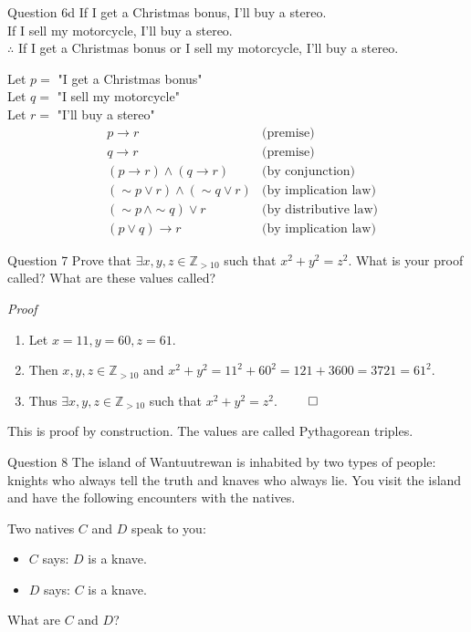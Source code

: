 \documentclass[10pt]{beamer}
\begin{document}
\begin{frame}[fragile]{Question 6d}
    If I get a Christmas bonus, I’ll buy a stereo. \\
    If I sell my motorcycle, I’ll buy a stereo. \\
    $\therefore$ If I get a Christmas bonus or I sell my motorcycle, I’ll buy a stereo. \par
    Let $p =$ "I get a Christmas bonus" \\
    Let $q =$ "I sell my motorcycle" \\
    Let $r =$ "I’ll buy a stereo"
\begin{align*}
    &p \rightarrow r &\text{(premise)} \\
    &q \rightarrow r &\text{(premise)} \\
    &(p \rightarrow r) \land (q \rightarrow r) &\text{(by conjunction)} \\
    &(\sim p \lor r) \land (\sim q \lor r) &\text{(by implication law)} \\
    &(\sim p \,\land \sim q) \lor r &\text{(by distributive law)} \\
    & (p \lor q) \rightarrow r &\text{(by implication law)}
\end{align*}
\end{frame}

\begin{frame}[fragile]{Question 7}
    Prove that $\exists x,y,z \in \mathbb{Z}_{>10}$ such that $x^2 + y^2 = z^2$. What is your proof called? What are these values called? \par
    \textit{Proof}
\begin{enumerate}
    \item Let $x = 11, y = 60, z = 61$.
    \item Then $x, y, z \in \mathbb{Z}_{>10}$ and $x^2 + y^2 = 11^2 + 60^2 = 121 + 3600 = 3721 = 61^2$.
    \item Thus $\exists x,y,z \in \mathbb{Z}_{>10}$ such that $x^2 + y^2 = z^2$. $\qed$
\end{enumerate}
    This is proof by construction. The values are called Pythagorean triples.
\end{frame}

\begin{frame}[fragile]{Question 8}
    The island of Wantuutrewan is inhabited by two types of people: knights who always tell the truth and knaves who always lie. You visit the island and have the following encounters with the natives. \par
    Two natives $C$ and $D$ speak to you:
    \begin{itemize}
        \item $C$ says: $D$ is a knave.
        \item $D$ says: $C$ is a knave.
    \end{itemize}
    What are $C$ and $D$?
\end{frame}
\end{document}
